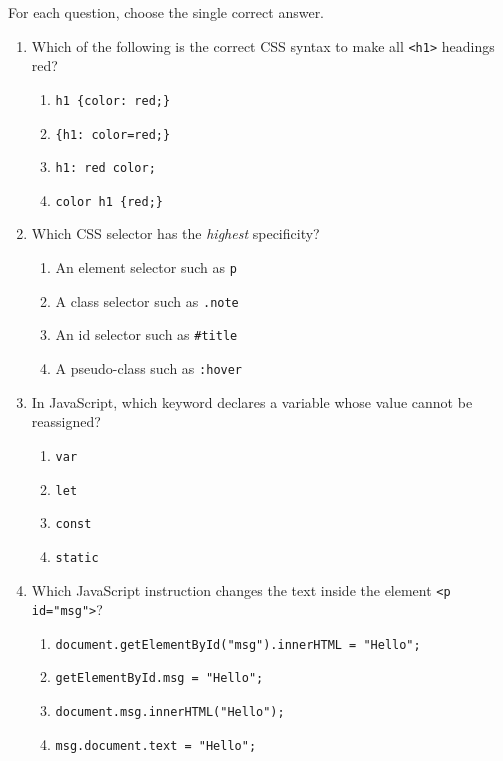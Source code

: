 \documentclass[11pt]{article}
\begin{document}
\begin{exercice}
For each question, choose the single correct answer.
\begin{enumerate}
\item Which of the following is the correct CSS syntax to make all \texttt{<h1>} headings red?
\begin{enumerate}
\item \texttt{h1 \{color: red;\}}
\item \texttt{\{h1: color=red;\}}
\item \texttt{h1: red color;}
\item \texttt{color h1 \{red;\}}
\end{enumerate}
\item Which CSS selector has the \emph{highest} specificity?
\begin{enumerate}
\item An element selector such as \texttt{p}
\item A class selector such as \texttt{.note}
\item An id selector such as \texttt{\#title}
\item A pseudo-class such as \texttt{:hover}
\end{enumerate}
\item In JavaScript, which keyword declares a variable whose value cannot be reassigned?
\begin{enumerate}
\item \texttt{var}
\item \texttt{let}
\item \texttt{const}
\item \texttt{static}
\end{enumerate}
\item Which JavaScript instruction changes the text inside the element \texttt{<p id="msg">}?
\begin{enumerate}
\item \texttt{document.getElementById("msg").innerHTML = "Hello";}
\item \texttt{getElementById.msg = "Hello";}
\item \texttt{document.msg.innerHTML("Hello");}
\item \texttt{msg.document.text = "Hello";}
\end{enumerate}
\end{enumerate}
\end{exercice}
\end{document}
